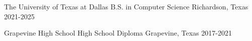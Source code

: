 
\begin{cvhonors}

\cvhonor
{The University of Texas at Dallas}
{B.S. in Computer Science}
{Richardson, Texas}
{2021-2025}

\cvhonor
{Grapevine High School}
{High School Diploma}
{Grapevine, Texas}
{2017-2021}


\end{cvhonors}
